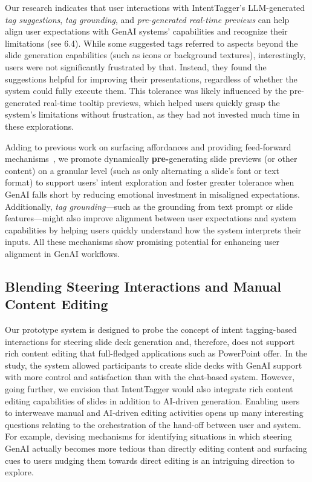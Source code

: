 Our research indicates that user interactions with IntentTagger's LLM-generated \textit{tag suggestions}, \textit{tag grounding}, and \textit{pre-generated real-time previews} can help align user expectations with GenAI systems' capabilities and recognize their limitations (see 6.4). While some suggested tags referred to aspects beyond the slide generation capabilities (such as icons or background textures), interestingly, users were not significantly frustrated by that. 
Instead, they found the suggestions helpful for improving their presentations, regardless of whether the system could fully execute them. 
This tolerance was likely influenced by the pre-generated real-time tooltip previews, which helped users quickly grasp the system’s limitations without frustration, as they had not invested much time in these explorations.

Adding to previous work on surfacing affordances and providing feed-forward mechanisms~\cite{vermeulen2013crossing, boy2015suggested, TerryCreativeNeedsUIDesign2002}, we promote dynamically \textbf{pre-}generating slide previews (or other content) on a granular level (such as only alternating a slide's font or text format) to support users’ intent exploration and foster greater tolerance when GenAI falls short by reducing emotional investment in misaligned expectations. 
Additionally, \textit{tag grounding}---such as the grounding from text prompt or slide features---might also improve alignment between user expectations and system capabilities by helping users quickly understand how the system interprets their inputs. 
All these mechanisms show promising potential for enhancing user alignment in GenAI workflows.




\subsection{\textbf{Blending Steering Interactions and Manual Content Editing }}  

Our prototype system is designed to probe the concept of intent tagging-based interactions for steering slide deck generation and, therefore, does not support rich content editing that full-fledged applications such as PowerPoint offer. 
In the study, the system allowed participants to create slide decks with GenAI support with more control and satisfaction than with the chat-based system. 
However, going further, we envision that IntentTagger would also integrate rich content editing capabilities of slides in addition to AI-driven generation. Enabling users to interweave manual and AI-driven editing activities opens up many interesting questions relating to the orchestration of the hand-off between user and system. 
For example, devising mechanisms for identifying situations in which steering GenAI actually becomes more tedious than directly editing content and surfacing cues to users nudging them towards direct editing is an intriguing direction to explore. 


